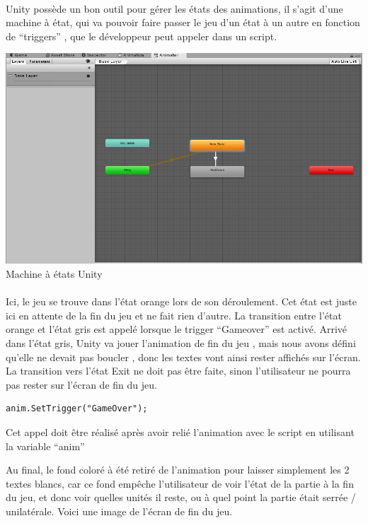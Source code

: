 \documentclass{report}
\begin{document}
\paragraph{}
Unity possède un bon outil pour gérer les états des animations, il s’agit d’une machine à état, qui va pouvoir faire passer le jeu d’un état à un autre en fonction de “triggers” , que le développeur peut appeler dans un script. 

\begin{center}
\includegraphics[scale=0.5]{DATA/machineetat.png}
 {Machine à états Unity}
\end{center}
\paragraph{}

Ici, le jeu se trouve dans l’état orange lors de son déroulement. Cet état est juste ici en attente de la fin du jeu et ne fait rien d’autre. 
La transition entre l’état orange et l’état gris est appelé lorsque le trigger “Gameover” est activé. Arrivé dans l’état gris, Unity va jouer l’animation de fin du jeu , mais nous avons défini qu’elle ne devait pas boucler , donc les textes vont ainsi rester affichés sur l’écran.
La transition vers l’état Exit ne doit pas être faite, sinon l’utilisateur ne pourra pas rester sur l’écran de fin du jeu.
\begin{lstlisting}[frame=single]
anim.SetTrigger("GameOver");
\end{lstlisting}

Cet appel doit être réalisé après avoir relié l’animation avec le script en utilisant la variable “anim”

Au final, le fond coloré à été retiré de l’animation pour laisser simplement les 2 textes blancs, car ce fond empêche l’utilisateur de voir l’état de la partie à la fin du jeu, et donc voir quelles unités il reste, ou à quel point la partie était serrée / unilatérale. Voici une image de l’écran de fin du jeu.
\end{document}
